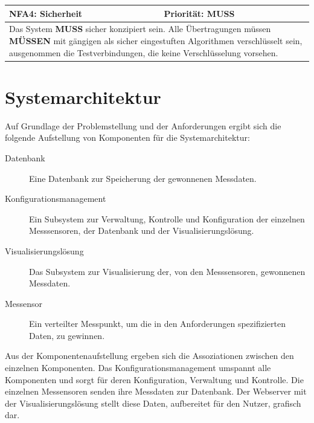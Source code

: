 \documentclass[titlepage]{report}
\begin{document}
\begin{center}
\begin{tabular}{p{}>{\raggedleft\arraybackslash}p{}}\toprule
    \textbf{NFA4: Sicherheit} & \textbf{Priorität: MUSS} \\\midrule
	\multicolumn{2}{p{\textwidth-\tabcolsep}}{%
        Das System \textbf{MUSS} sicher konzipiert sein.
        Alle Übertragungen müssen \textbf{MÜSSEN} mit gängigen
        als sicher eingestuften Algorithmen verschlüsselt sein,
        ausgenommen die Testverbindungen, die keine Verschlüsselung
        vorsehen.
        }\\\bottomrule
\end{tabular}
\end{center}
\section*{Systemarchitektur}
Auf Grundlage der Problemstellung und der Anforderungen ergibt sich die
folgende Aufstellung von Komponenten für die Systemarchitektur:
\begin{description}
    \item[Datenbank] Eine Datenbank zur Speicherung der
                     gewonnenen Messdaten.
    \item[Konfigurationsmanagement] Ein Subsystem zur Verwaltung, Kontrolle
        und Konfiguration der einzelnen Messsensoren, der Datenbank und
        der Visualisierungslösung.
    \item[Visualisierungslösung] Das Subsystem zur Visualisierung der, von
        den Messsensoren, gewonnenen Messdaten.
    \item[Messensor] Ein verteilter Messpunkt, um die in den
        Anforderungen spezifizierten Daten, zu gewinnen.
\end{description}
Aus der Komponentenaufstellung ergeben sich die Assoziationen zwischen
den einzelnen Komponenten. Das Konfigurationsmanagement umspannt alle
Komponenten und sorgt für deren Konfiguration, Verwaltung und Kontrolle.
Die einzelnen Messensoren senden ihre Messdaten zur Datenbank. Der
Webserver mit der Visualisierungslösung stellt diese Daten, aufbereitet
für den Nutzer, grafisch dar.
\end{document}
